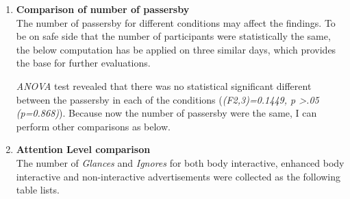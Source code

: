 \begin{enumerate}
\item \textbf{Comparison of number of passersby} \\
The number of passersby for different conditions may affect the findings. To be on safe side that the number of participants were statistically the same, the below computation has be applied on three similar days, which provides the base for further evaluations.


\begin{table}[H]
\caption{Number of people for three conditions}
\label{tab:newbodypasserbyofthreeweeks}
\centering
{}
\end{table}

\emph{ANOVA} test revealed that there was no statistical significant different between the passersby in each of the conditions (\emph{(F2,3)=0.1449, p >.05 (p=0.868)}). Because now the number of passersby were the same, I can perform other comparisons as below.


\item \textbf{Attention Level comparison}  \\
The number of \emph{Glances} and \emph{Ignores} for both body interactive, enhanced body interactive and non-interactive advertisements were collected as the following table lists.

\begin{table}[H]
\caption{Cross tabulation for each condition attention level}
\label{tab:newbodycrosstabulationweeks}
\centering
{}
\end{table}



\end{enumerate}
